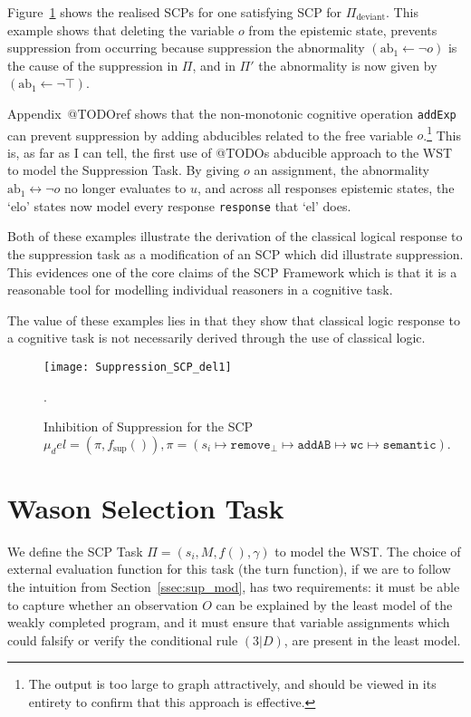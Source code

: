 Figure~\ref{fig:Suppression_SCP_del1} shows the realised SCPs for one satisfying SCP for $\Pi_\text{deviant}$. This example shows that deleting the variable $o$ from the epistemic state, prevents suppression from occurring because suppression the abnormality $(\text{ab}_1 \leftarrow \lnot o )$ is the cause of the suppression in $\Pi$, and in $\Pi'$ the abnormality is now given by $(\text{ab}_1 \leftarrow \lnot \top )$.

Appendix~@TODOref shows that the non-monotonic cognitive operation \texttt{addExp} can prevent suppression by adding abducibles related to the  free variable $o$.\footnote{The output is too large to graph attractively, and should be viewed in its entirety to confirm that this approach is effective.} This is, as far as I can tell, the first use of @TODOs abducible approach to the WST to model the Suppression Task. By giving $o$ an assignment, the abnormality $\text{ab}_1\leftrightarrow \lnot o$ no longer evaluates to $u$, and across all responses epistemic states, the `elo' states now model every response \texttt{response} that `el' does.

Both of these examples illustrate the derivation of the classical logical response to the suppression task as a modification of an SCP which did illustrate suppression. This evidences one of the core claims of the SCP Framework which is that it is a reasonable tool for modelling individual reasoners in a cognitive task. 

The value of these examples lies in that they show that classical logic response to a cognitive task is not necessarily derived through the use of classical logic.

\begin{figure}
\centering \texttt{[image: Suppression\_SCP\_del1]}
\caption{Inhibition of Suppression for the SCP $\mu_del=(\pi,f_\text{sup}()), \pi = (s_i \longmapsto \texttt{remove}_\bot \longmapsto \texttt{addAB} \longmapsto \texttt{wc} \longmapsto \texttt{semantic}).$}.
\label{fig:Suppression_SCP_del1}
\end{figure}


\section{Wason Selection Task}\label{sec:wstSCP}

We define the SCP Task $\Pi=(s_i,M,f(),\gamma)$ to model the WST. The choice of external evaluation function for this task (the turn function), if we are to follow the intuition from Section~\ref{ssec:sup_mod}, has two requirements: it must be able to capture whether an observation $O$ can be explained by the least model of the weakly completed program, and it must ensure that variable assignments which could falsify or verify the conditional rule $(3|D)$, are present in the least model. 

